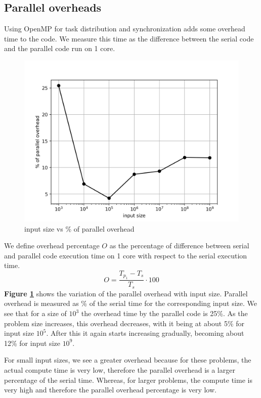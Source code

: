 \documentclass[12,a4paper]{article}
\begin{document}
    \subsection{Parallel overheads}
    Using OpenMP for task distribution and synchronization adds some overhead time to the code. We measure this time as the difference between the serial code and the parallel code run on 1 core.
    \begin{figure}[H]
        \centering
        \includegraphics[width=\textwidth]{overhead.png}
        \caption{input size vs \% of parallel overhead}
        \label{fig:q1p1}
    \end{figure}
    We define overhead percentage $O$ as the percentage of difference between serial and parallel code execution time on 1 core with respect to the serial execution time.
    \begin{equation}
        O = \frac{T_{p_1} - T_s}{T_s} \cdot 100
    \end{equation}
    \textbf{Figure \ref{fig:q1p1}} shows the variation of the parallel overhead with input size. Parallel overhead is measured as \% of the serial time for the corresponding input size. We see that for a size of $10^3$ the overhead time by the parallel code is 25\%. As the problem size increases, this overhead decreases, with it being at about 5\% for input size $10^5$. After this it again starts increasing gradually, becoming about 12\% for input size $10^9$.
    
    For small input sizes, we see a greater overhead because for these problems, the actual compute time is very low, therefore the parallel overhead is a larger percentage of the serial time. Whereas, for larger problems, the compute time is very high and therefore the parallel overhead percentage is very low.
\end{document}
